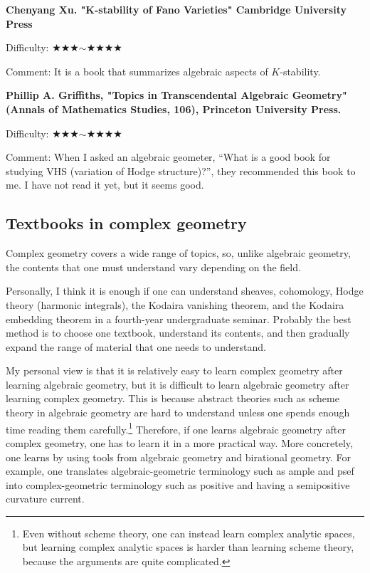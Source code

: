  \textbf{Chenyang Xu. "K-stability of Fano Varieties" Cambridge University Press} \vspace{-6pt}

Difficulty: ★★★$\sim$★★★★\vspace{-6pt} 

Comment: It is a book that summarizes algebraic aspects of $K$-stability.
 \vspace{8pt}
 
 \textbf{Phillip A. Griffiths, "Topics in Transcendental Algebraic Geometry" (Annals of Mathematics Studies, 106), Princeton University Press.} \vspace{-6pt}

Difficulty: ★★★$\sim$★★★★\vspace{-6pt}

Comment: When I asked an algebraic geometer, ``What is a good book for studying VHS (variation of Hodge structure)?'', they recommended this book to me. I have not read it yet, but it seems good.
\vspace{8pt}


\subsection{Textbooks in complex geometry}
Complex geometry covers a wide range of topics, so, unlike algebraic geometry, the contents that one must understand vary depending on the field.

Personally, I think it is enough if one can understand sheaves, cohomology, Hodge theory (harmonic integrals), the Kodaira vanishing theorem, and the Kodaira embedding theorem in a fourth-year undergraduate seminar. Probably the best method is to choose one textbook, understand its contents, and then gradually expand the range of material that one needs to understand.

My personal view is that it is relatively easy to learn complex geometry after learning algebraic geometry, but it is difficult to learn algebraic geometry after learning complex geometry. 
This is because abstract theories such as scheme theory in algebraic geometry are hard to understand unless one spends enough time reading them carefully.\footnote{Even without scheme theory, one can instead learn complex analytic spaces, but learning complex analytic spaces is harder than learning scheme theory, because the arguments are quite complicated.} 
Therefore, if one learns algebraic geometry after complex geometry, one has to learn it in a more practical way. More concretely, one learns by using tools from algebraic geometry and birational geometry. For example, one translates algebraic-geometric terminology such as ample and psef into complex-geometric terminology such as positive and having a semipositive curvature current.

